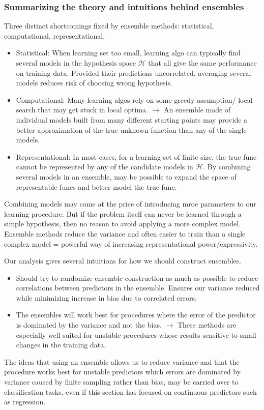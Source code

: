 \documentclass[norsk,a4paper,11pt]{article}
\begin{document}
\subsubsection{Summarizing the theory and intuitions behind ensembles}
Three distinct shortcomings fixed by ensemble methods: statistical, computational, representational. 
\begin{itemize}
	\item Statistical: When learning set too small, learning algo can typically find several models in the hypothesis space $\mathcal{H}$ that all give the same performance on training data. Provided their predictions uncorrelated, averaging several models reduces risk of choosing wrong hypothesis.
	\item Computational: Many learning algos rely on some greedy assumption/ local search that may get stuck in local optima. $\rightarrow$ An ensemble made of individual models built from many different starting points may provide a better approximation of the true unknown function than any of the single models.
	\item Representational: In most cases, for a learning set of finite size, the true func cannot be represented by any of the candidate models in $\mathcal{H}$. By combining several models in an ensemble, may be possible to expand the space of representable funcs and better model the true func.
\end{itemize}
Combining models may come at the price of introducing mroe parameters to our learning procedure. But if the problem itself can never be learned through a simple hypothesis, then no reason to avoid applying a more complex model. Ensemble methods reduce the variance and often easier to train than a single complex model = powerful way of increasing representational power/expressivity.

Our analysis gives several intuitions for how we should construct ensembles. 
\begin{itemize}
	\item Should try to randomize ensemble construction as much as possible to reduce correlations between predictors in the ensemble. Ensures our variance reduced while minimizing increase in bias due to correlated errors.
	\item The ensembles will work best for procedures where the error of the predictor is dominated by the variance and not the bias. $\rightarrow$ These methods are especially well suited for unstable procedures whose results sensitive to small changes in the training data.
\end{itemize}
The ideas that using an ensemble allows us to reduce variance and that the procedure works best for unstable predictors which errors are dominated by variance caused by finite sampling rather than bias, may be carried over to classification tasks, even if this section has focused on continuous predictors such as regression.
\end{document}
